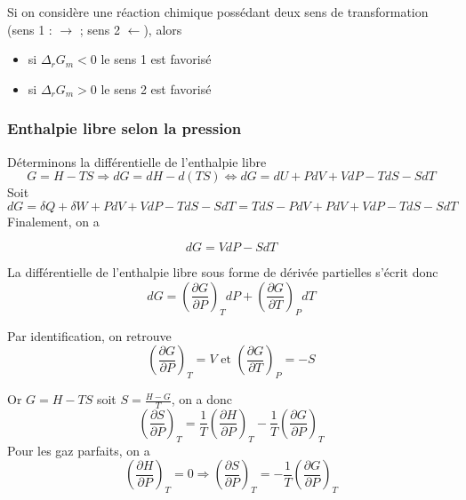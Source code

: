 \begin{theorem}

Si on considère une réaction chimique possédant deux sens de transformation (sens 1 : $\rightarrow$ ; sens 2 $\leftarrow$), alors
\begin{itemize}
\item si $\Delta_rG_m <0$ le sens 1 est favorisé
\item si $\Delta_rG_m >0$ le sens 2 est favorisé
\end {itemize}
\end{theorem}

\subsubsection{Enthalpie libre selon la pression}

Déterminons la différentielle de l'enthalpie libre
$$G=H-TS \Rightarrow dG=dH-d(TS)\Leftrightarrow dG=dU+PdV+VdP-TdS-SdT$$
Soit
$$dG=\delta Q + \delta W + PdV + VdP -TdS-SdT = TdS-PdV+PdV+VdP-TdS-SdT$$
Finalement, on a
\begin{definition}
\begin{equation}
dG=VdP-SdT
\end{equation}
\end{definition}
La différentielle de l'enthalpie libre sous forme de dérivée partielles s'écrit donc
\begin {equation}
dG=\left ( \frac{\partial G}{\partial P} \right )_TdP+\left ( \frac{\partial G}{\partial T} \right ) _P dT
\end{equation}

\begin{corollary}
Par identification, on retrouve
\begin{equation}
\left ( \frac{\partial G}{\partial P} \right ) _ T = V \textrm{ et } \left ( \frac {\partial G}{\partial T} \right ) _ P = -S
\end{equation}
\end{corollary}

Or $G=H-TS$ soit $S = \frac{H-G}{T}$, on a donc 
$$\left ( \frac{\partial S}{\partial P} \right ) _ T = \frac{1}{T} \left ( \frac{\partial H}{\partial P}\right ) _T - \frac{1}{T} \left ( \frac{\partial G}{\partial P} \right ) _ T$$
Pour les gaz parfaits, on a 
$$\left ( \frac{\partial H}{\partial P}\right )_T=0 \Rightarrow \left ( \frac{\partial S}{\partial P} \right ) _T = - \frac{1}{T}\left ( \frac{\partial G}{\partial P} \right )_T$$


